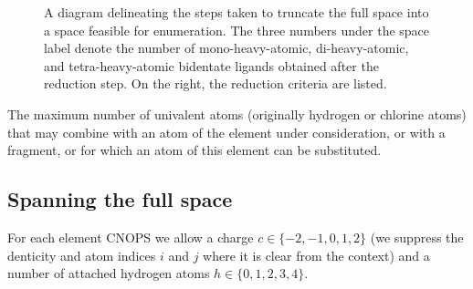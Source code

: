  \begin{figure}[] %
 \centering
 \caption{A diagram delineating the steps taken to truncate the full space into a space feasible for enumeration. The three numbers under the space label denote the number of mono-heavy-atomic, di-heavy-atomic, and tetra-heavy-atomic bidentate ligands obtained after the reduction step. On the right, the reduction criteria are listed.}
 \label{fig:truncation}
 \end{figure}
 
 \begin{infobox}
 The maximum number of univalent atoms (originally hydrogen or chlorine atoms) that may combine with an atom of the element under consideration, or with a fragment, or for which an atom of this element can be substituted.
 \label{info:valency}
 \end{infobox}
 
\subsection{Spanning the full space}
For each element CNOPS we allow a charge $c \in \{-2,-1,0,1,2\}$ (we suppress the denticity and atom indices $i$ and $j$ where it is clear from the context) and a number of attached hydrogen atoms $h \in \{0,1,2,3,4\}$.

